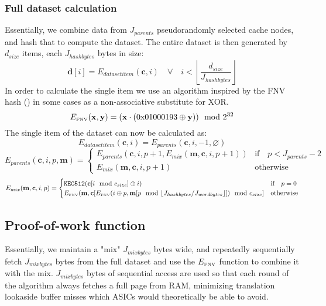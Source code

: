 \documentclass[9pt,oneside]{amsart}
\begin{document}
\subsubsection{Full dataset calculation} \label{dataset} 
Essentially, we combine data from $J_{parents}$ pseudorandomly selected cache nodes, and hash that to compute the dataset. The entire dataset is then generated by $d_{size}$ items, each $J_{hashbytes}$ bytes in size:
\begin{equation}
 \mathbf{d}[i] = E_{datasetitem}(\mathbf{c}, i) \quad \forall \quad i < \left\lfloor\frac{d_{size}}{J_{hashbytes}}\right\rfloor
\end{equation}
In order to calculate the single item we use an algorithm inspired by the FNV hash (\cite{FowlerNollVo1991FNVHash}) in some cases as a non-associative substitute for XOR.
\begin{equation}
 E_\text{\tiny FNV}(\mathbf{x}, \mathbf{y}) = (\mathbf{x} \cdot (\mathrm{0x01000193} \oplus \mathbf{y})) \mod 2^{32}
\end{equation}
The single item of the dataset can now be calculated as:
\begin{equation}
 E_{datasetitem}(\mathbf{c}, i) = E_{parents}(\mathbf{c}, i, -1, \varnothing)
\end{equation}
\begin{equation}
  E_{parents}(\mathbf{c}, i, p, \mathbf{m}) = \begin{cases}
E_{parents}(\mathbf{c}, i, p +1, E_{mix}(\mathbf{m}, \mathbf{c}, i, p + 1)) & \text{if} \quad p < J_{parents} -2 \\
E_{mix}(\mathbf{m}, \mathbf{c}, i, p + 1) & \text{otherwise}
\end{cases}
\end{equation}
\begin{equation}
 E_{mix}(\mathbf{m}, \mathbf{c}, i, p) = \begin{cases}
\texttt{KEC512}(\mathbf{c}[i \mod c_{size}] \oplus i) & \text{if} \quad p = 0 \\
E_\text{\tiny FNV}(\mathbf{m}, \mathbf{c}[E_\text{\tiny FNV}(i \oplus p, \mathbf{m}[p \mod \lfloor J_{hashbytes} / J_{wordbytes} \rfloor]) \mod c_{size}] & \text{otherwise}
\end{cases}
\end{equation}

\subsection{Proof-of-work function}
Essentially, we maintain a "mix" $J_{mixbytes}$ bytes wide, and repeatedly sequentially fetch $J_{mixbytes}$ bytes from the full dataset and use the $E_\text{\tiny FNV}$ function to combine it with the mix. $J_{mixbytes}$ bytes of sequential access are used so that each round of the algorithm always fetches a full page from RAM, minimizing translation lookaside buffer misses which ASICs would theoretically be able to avoid.
\end{document}
